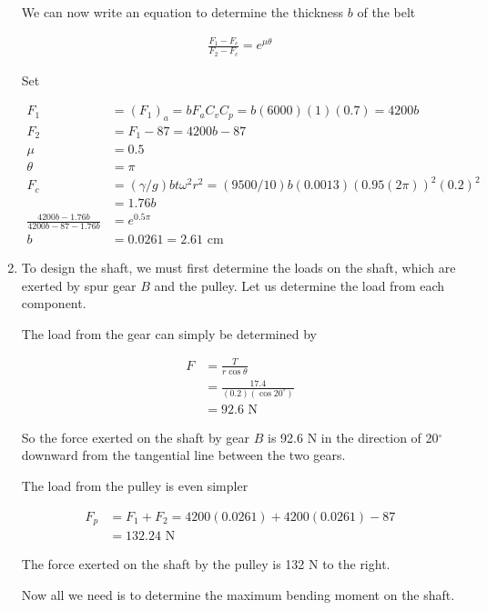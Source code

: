 \documentclass[a4paper,openany]{kaobook}
\begin{document}
\begin{enumerate}
We can now write an equation to determine the thickness \(b\) of the belt

\begin{align*}
  \frac{F_{1} - F_{c}}{F_{2} - F_{c}} = e^{\mu \theta}
\end{align*}

Set

\begin{align*}
     F_{1} &= (F_{1})_{a} = bF_{a}C_{v}C_{p} = b(6000)(1)(0.7) = 4200b \\
     F_{2} &= F_{1} - 87 = 4200b - 87 \\
     \mu &= 0.5 \\
     \theta &= \pi \\
     F_{c} &= (\gamma/g)bt \omega^{2} r^{2} = (9500/10)b(0.0013)(0.95(2\pi))^{2}(0.2)^{2} \\
        &= 1.76b \\
     \frac{4200b - 1.76b}{4200b - 87 - 1.76b} &= e^{0.5 \pi} \\
     b &= 0.0261 = 2.61 \text{ cm}
   \end{align*}

\item To design the shaft, we must first determine the loads on the shaft, which are exerted by spur gear \(B\) and the pulley. Let us determine the load from each component.

The load from the gear can simply be determined by

\begin{align*}
     F &= \frac{T}{r \cos \theta} \\
       &= \frac{17.4}{(0.2)(\cos 20^{\circ})} \\
       &= 92.6 \text{ N}
   \end{align*}

So the force exerted on the shaft by gear \(B\) is 92.6 N in the direction of 20\(^{\circ}\) downward from the tangential line between the two gears.

The load from the pulley is even simpler

\begin{align*}
     F_{p} &= F_{1} + F_{2} = 4200(0.0261) + 4200(0.0261) - 87 \\
           &= 132.24 \text{ N}
   \end{align*}

The force exerted on the shaft by the pulley is 132 N to the right.

Now all we need is to determine the maximum bending moment on the
shaft.


\end{enumerate}
\end{document}
